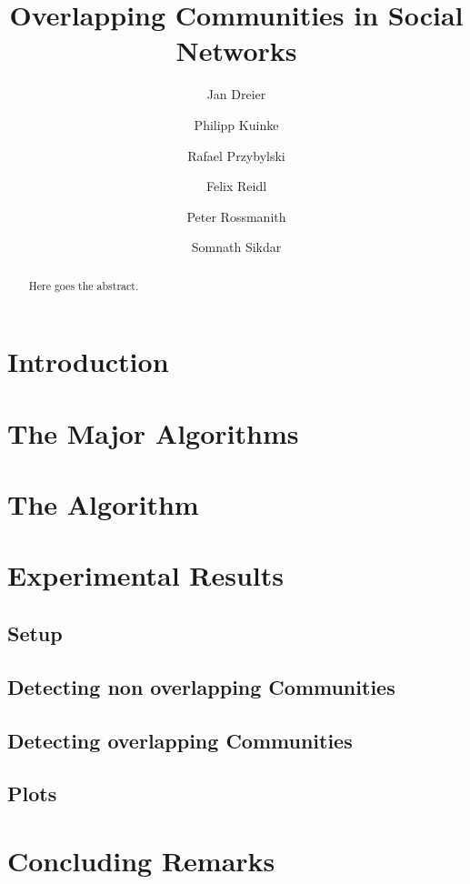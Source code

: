 \documentclass[12pt]{article}
\title{Overlapping Communities in Social Networks}
\author{Jan Dreier 
\and Philipp Kuinke 
\and Rafael Przybylski 
\and Felix Reidl 
\and Peter Rossmanith 
\and Somnath Sikdar}
\date{}
\begin{document}
\maketitle

\begin{abstract}
Here goes the abstract.
\end{abstract}

\section{Introduction}


\section{The Major Algorithms} \label{sec:major_algorithms}


\section{The Algorithm} \label{sec:algorithm}


\section{Experimental Results} \label{sec:experiments}

\subsection{Setup}


\subsection{Detecting non overlapping Communities}


\subsection{Detecting overlapping Communities}


\subsection{Plots}


\section{Concluding Remarks} \label{sec:conclusions}
\end{document}
